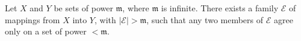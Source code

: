 Let $X$ and $Y$ be sets of power $\mathfrak{m}$, where $\mathfrak{m}$ is infinite. There exists a family $\mathcal{E}$ of mappings from $X$ into $Y$, with $|\mathcal{E}| > \mathfrak{m}$, such that any two members of $\mathcal{E}$ agree only on a set of power $< \mathfrak{m}$.